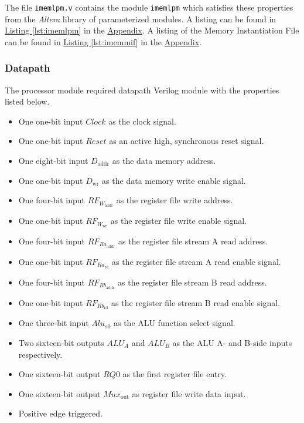 The file \verb|imemlpm.v| contains the module \verb|imemlpm| which satisfies these properties
from the \emph{Altera} library of parameterized modules.
A listing can be found in \hyperref[lst:imemlpm]{Listing \ref*{lst:imemlpm}} in the \hyperref[sec:appendix]{Appendix}.
A listing of the Memory Instantiation File can be found in \hyperref[lst:imemmif]{Listing \ref*{lst:imemmif}} in the \hyperref[sec:appendix]{Appendix}.

\subsubsection{Datapath} \label{subsub:datapath}

The processor module required datapath Verilog module with the properties listed below.

\begin{itemize}
    \item One one-bit input $Clock$ as the clock signal.
    \item One one-bit input $Reset$ as an active high, synchronous reset signal.
    \item One eight-bit input $D_\text{addr}$ as the data memory address.
    \item One one-bit input $D_\text{wr}$ as the data memory write enable signal.
    \item One four-bit input $RF_{W_\text{addr}}$ as the register file write address.
    \item One one-bit input $RF_{W_\text{wr}}$ as the register file write enable signal.
    \item One four-bit input $RF_{Ra_\text{addr}}$ as the register file stream A read address.
    \item One one-bit input $RF_{Ra_\text{rd}}$ as the register file stream A read enable signal.
    \item One four-bit input $RF_{Rb_\text{addr}}$ as the register file stream B read address.
    \item One one-bit input $RF_{Rb_\text{rd}}$ as the register file stream B read enable signal.
    \item One three-bit input $Alu_{s0}$ as the ALU function select signal.
    \item Two sixteen-bit outputs $ALU_A$ and $ALU_B$ as the ALU A- and B-side inputs respectively.
    \item One sixteen-bit output $RQ0$ as the first register file entry.
    \item One sixteen-bit output $Mux_\text{out}$ as register file write data input.
    \item Positive edge triggered.
\end{itemize}

